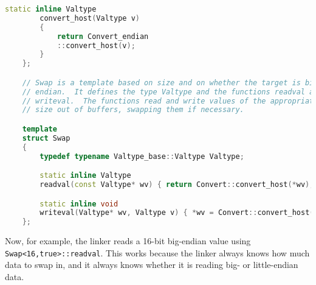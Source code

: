 \begin{lstlisting}[language=C++]
        static inline Valtype
        convert_host(Valtype v)
        {
            return Convert_endian
            ::convert_host(v);
        }
    };

    // Swap is a template based on size and on whether the target is big
    // endian.  It defines the type Valtype and the functions readval and
    // writeval.  The functions read and write values of the appropriate
    // size out of buffers, swapping them if necessary.

    template
    struct Swap
    {
        typedef typename Valtype_base::Valtype Valtype;

        static inline Valtype
        readval(const Valtype* wv) { return Convert::convert_host(*wv); }

        static inline void
        writeval(Valtype* wv, Valtype v) { *wv = Convert::convert_host(v); }
    };
\end{lstlisting}

Now, for example, the linker reads a 16-bit big-endian value using
\texttt{Swap<16,true>::readval}.  This works because the linker always knows
how much data to swap in, and it always knows whether it is reading big- or
little-endian data.
